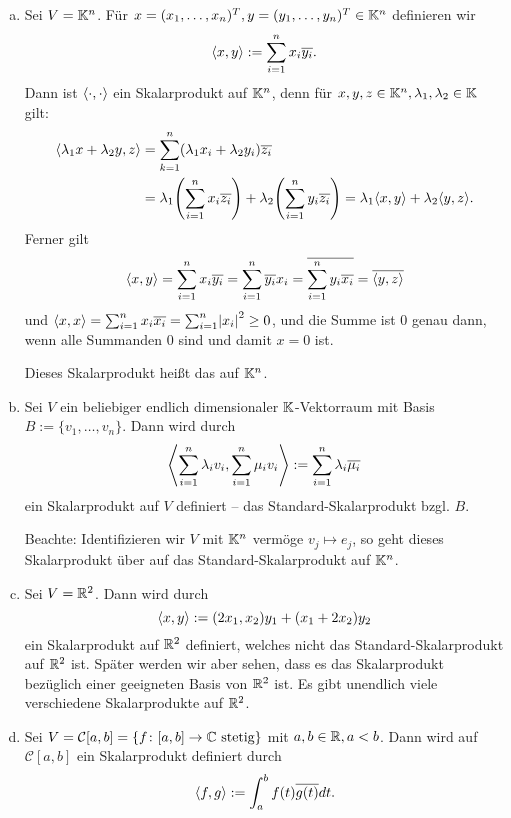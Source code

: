 \begin{beispiel}
	\label{bsp:3.3}
	\begin{enumerate}[(a)]
		\item Sei $V = \mathbb{K}^n$.
		Für $x = (x_1,\dots,x_n)^T, y = (y_1,\dots,y_n)^T \in \mathbb{K}^n$ definieren wir
		\[
			\left\langle x,y\right\rangle := \sum_{i=1}^{n} x_i \overline{y_i}.
		\]
		Dann ist $\langle\cdot,\cdot\rangle$ ein Skalarprodukt auf $\mathbb{K}^n$, denn für $x,y,z \in \mathbb{K}^n, \lambda_1,\lambda_2 \in \mathbb{K}$ gilt:
		\begin{align*}
			\sk{\lambda_1 x + \lambda_2 y,z} &= \sum_{k=1}^{n} (\lambda_1 x_i + \lambda_2 y_i)\ol{z_i} \\
			&= \lambda_1 \enb{\sum_{i=1}^n x_i \ol{z_i}} + \lambda_2 \enb{\sum_{i=1}^{n} y_i \ol{z_i}} = \lambda_1 \sk{x,y} + \lambda_2 \sk{y,z}.
		\end{align*}
		Ferner gilt
		\[
			\left\langle x,y\right\rangle = \sum_{i=1}^{n} x_i \overline{y_i} = \sum_{i=1}^{n} \overline{y_i}x_i = \overline{\sum_{i=1}^{n} y_i \overline{x_i}} = \overline{\left\langle y,z\right\rangle}
		\]
		und $\sk{x,x} = \sum_{i=1}^{n} x_i \ol{x_i} = \sum_{i=1}^{n} \abs{x_i}^2 \geq 0$, und die Summe ist $0$ genau dann, wenn alle Summanden 0 sind und damit $x = 0$ ist.
		
		Dieses Skalarprodukt heißt das  auf $\mathbb{K}^n$.
		\item Sei $V$ ein beliebiger endlich dimensionaler $\mathbb{K}$-Vektorraum mit Basis $B := \{v_1,\dots,v_n\}$.
		Dann wird durch
		\[
			\left\langle\sum_{i=1}^{n} \lambda_i v_i, \sum_{i=1}^{n} \mu_i v_i\right\rangle := \sum_{i=1}^n \lambda_i \overline{\mu_i}
		\]
		ein Skalarprodukt auf $V$ definiert -- das Standard-Skalarprodukt bzgl. $B$.
		
		Beachte: Identifizieren wir $V$ mit $\mathbb{K}^n$ vermöge $v_j \mapsto e_j$, so geht dieses Skalarprodukt über auf das Standard-Skalarprodukt auf $\mathbb{K}^n$.
		\item Sei $V = \mathbb{R}^2$.
		Dann wird durch
		\[
			\left\langle x,y\right\rangle := (2x_1,x_2)y_1 + (x_1+2x_2)y_2
		\]
		ein Skalarprodukt auf $\mathbb{R}^2$ definiert, welches nicht das Standard-Skalarprodukt auf $\mathbb{R}^2$ ist.
		Später werden wir aber sehen, dass es das Skalarprodukt bezüglich einer geeigneten Basis von $\mathbb{R}^2$ ist.
		Es gibt unendlich viele verschiedene Skalarprodukte auf $\mathbb{R}^2$.
		\item Sei $V = \mathcal{C}[a,b] = \{f \colon [a,b] \rightarrow \mathbb{C} \text{ stetig}\}$ mit $a,b \in \mathbb{R}, a < b$.
		Dann wird auf $\mathcal{C}[a,b]$ ein Skalarprodukt definiert durch
		\[
			\left\langle f,g\right\rangle := \int_{a}^{b} f(t) \overline{g(t)} dt.
		\]
	\end{enumerate}
\end{beispiel}

